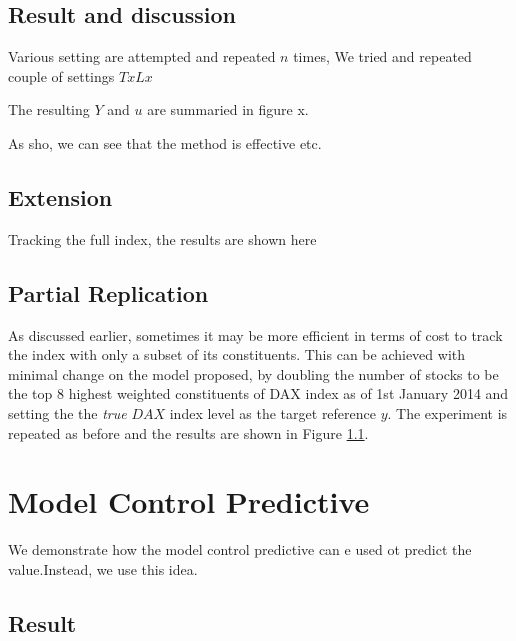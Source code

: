 \subsection{Result and discussion}
Various setting are attempted and repeated $n$ times, We tried and repeated couple of settings $T x L x $

The resulting $Y$ and $u$ are summaried in figure x.

As sho, we can see that the method is effective etc.

\subsection{Extension}
Tracking the full index, the results are shown here

\subsection{Partial Replication}
As discussed earlier, sometimes it may be more efficient in terms of cost to track the index with only a subset of its constituents. This can be achieved with minimal change on the model proposed, by doubling the number of stocks to be the top $8$ highest weighted constituents of DAX index as of 1st January 2014 and setting the the \emph{true} $DAX$ index level as the target reference $y$. The experiment is repeated as before and the results are shown in Figure \ref{}.

\section{Model Control Predictive}
We demonstrate how the model control predictive can e used ot predict the value.Instead, we use this idea.


\subsection{Result}

\endinput


\section{Evidence for the thesis and future work}
\label{sec:5.eftt}
Formulating an optimal security policy is difficult. Current research
work attempts to alleviate this issue by looking for ways to analyse
and refine security policies in a top-down manner. We propose an
alternative view on this issue: inferring security policies from
decision examples. This idea is entirely novel. There is no previous
work to my knowledge in the application of EAs or machine learning
techniques in inferring security policies.

